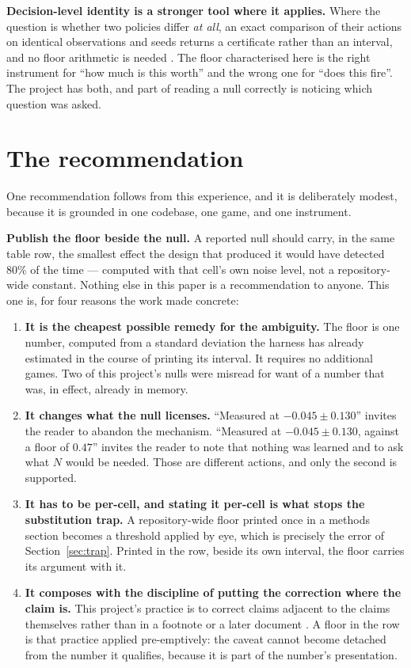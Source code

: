\documentclass[11pt]{article}
\begin{document}
\textbf{Decision-level identity is a stronger tool where it applies.} Where the question is whether
two policies differ \emph{at all}, an exact comparison of their actions on identical observations and
seeds returns a certificate rather than an interval, and no floor arithmetic is needed
\cite{inertaxis}. The floor characterised here is the right instrument for ``how much is this worth''
and the wrong one for ``does this fire''. The project has both, and part of reading a null correctly
is noticing which question was asked.

\section{The recommendation}
\label{sec:rec}

One recommendation follows from this experience, and it is deliberately modest, because it is
grounded in one codebase, one game, and one instrument.

\textbf{Publish the floor beside the null.} A reported null should carry, in the same table row, the
smallest effect the design that produced it would have detected 80\% of the time --- computed with
that cell's own noise level, not a repository-wide constant. Nothing else in this paper is a
recommendation to anyone. This one is, for four reasons the work made concrete:

\begin{enumerate}
  \item \textbf{It is the cheapest possible remedy for the ambiguity.} The floor is one number,
  computed from a standard deviation the harness has already estimated in the course of printing its
  interval. It requires no additional games. Two of this project's nulls were misread for want of a
  number that was, in effect, already in memory.
  \item \textbf{It changes what the null licenses.} ``Measured at $-0.045 \pm 0.130$'' invites the
  reader to abandon the mechanism. ``Measured at $-0.045 \pm 0.130$, against a floor of $0.47$''
  invites the reader to note that nothing was learned and to ask what $N$ would be needed. Those are
  different actions, and only the second is supported.
  \item \textbf{It has to be per-cell, and stating it per-cell is what stops the substitution
  trap.} A repository-wide floor printed once in a methods section becomes a threshold applied by
  eye, which is precisely the error of Section~\ref{sec:trap}. Printed in the row, beside its own
  interval, the floor carries its argument with it.
  \item \textbf{It composes with the discipline of putting the correction where the claim is.} This
  project's practice is to correct claims adjacent to the claims themselves rather than in a
  footnote or a later document \cite{inertaxis, concession}. A floor in the row is that practice
  applied pre-emptively: the caveat cannot become detached from the number it qualifies, because it
  is part of the number's presentation.
\end{enumerate}
\end{document}
